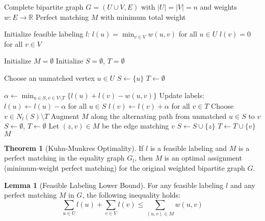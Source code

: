 \documentclass{article}
\theoremstyle{definition}
\newtheorem{theorem}{Theorem}
\newtheorem{lemma}{Lemma}
\begin{document}
\begin{algorithm}
\caption{Kuhn-Munkres Algorithm}
\begin{algorithmic}[1]
\Require Complete bipartite graph $G = (U \cup V, E)$ with $|U| = |V| = n$ and weights $w: E \rightarrow \mathbb{R}$
\Ensure Perfect matching $M$ with minimum total weight

\State Initialize feasible labeling $l$:
\State $l(u) = \min_{v \in V} w(u,v)$ for all $u \in U$
\State $l(v) = 0$ for all $v \in V$

\State Initialize $M = \emptyset$ 
\State Initialize $S = \emptyset$, $T = \emptyset$ 

 
        \State Choose an unmatched vertex $u \in U$
        \State $S \gets \{u\}$
        \State $T \gets \emptyset$
    \EndIf
    
     
        \State $\alpha \gets \min_{u \in S, v \in V \setminus T} \{l(u) + l(v) - w(u,v)\}$
        \State Update labels:
        \State $l(u) \gets l(u) - \alpha$ for all $u \in S$
        \State $l(v) \gets l(v) + \alpha$ for all $v \in T$
    \Else
        \State Choose $v \in N_l(S) \setminus T$
            \State Augment $M$ along the alternating path from unmatched $u \in S$ to $v$
            \State $S \gets \emptyset$, $T \gets \emptyset$ 
        \Else
            \State Let $(z, v) \in M$ be the edge matching $v$
            \State $S \gets S \cup \{z\}$
            \State $T \gets T \cup \{v\}$
        \EndIf
    \EndIf
\EndWhile
\State \Return $M$
\end{algorithmic}
\end{algorithm}
\begin{theorem}[Kuhn-Munkres Optimality]
If $l$ is a feasible labeling and $M$ is a perfect matching in the equality graph $G_l$, then $M$ is an optimal assignment (minimum-weight perfect matching) for the original weighted bipartite graph $G$.
\end{theorem}
\begin{lemma}[Feasible Labeling Lower Bound]
For any feasible labeling $l$ and any perfect matching $M$ in $G$, the following inequality holds:
\begin{equation}
\sum_{u \in U} l(u) + \sum_{v \in V} l(v) \leq \sum_{(u,v) \in M} w(u,v)
\end{equation}
\end{lemma}
\end{document}
